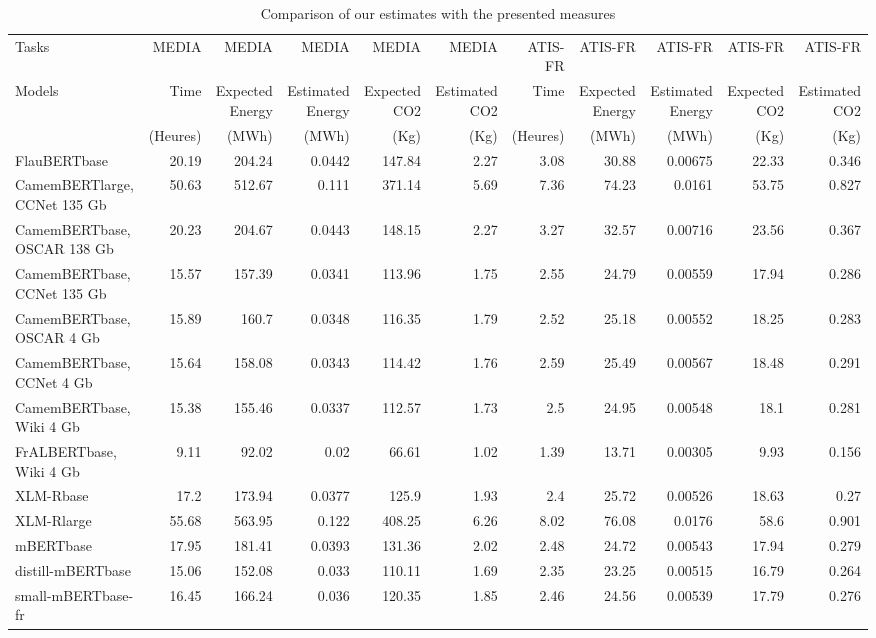 \documentclass[11pt]{article}
\begin{document}
\begin{table}[htbp]
\caption{Comparison of our estimates with the presented measures}
\centering
\begin{tabular}{lrrrrrrrrrr}
Tasks & MEDIA & MEDIA & MEDIA & MEDIA & MEDIA & ATIS-FR & ATIS-FR & ATIS-FR & ATIS-FR & ATIS-FR\\
Models & Time & Expected Energy & Estimated Energy & Expected CO2 & Estimated CO2 & Time & Expected Energy & Estimated Energy & Expected CO2 & Estimated CO2\\
 & (Heures) & (MWh) & (MWh) & (Kg) & (Kg) & (Heures) & (MWh) & (MWh) & (Kg) & (Kg)\\
\hline
FlauBERTbase & 20.19 & 204.24 & 0.0442 & 147.84 & 2.27 & 3.08 & 30.88 & 0.00675 & 22.33 & 0.346\\
CamemBERTlarge, CCNet 135 Gb & 50.63 & 512.67 & 0.111 & 371.14 & 5.69 & 7.36 & 74.23 & 0.0161 & 53.75 & 0.827\\
CamemBERTbase, OSCAR 138 Gb & 20.23 & 204.67 & 0.0443 & 148.15 & 2.27 & 3.27 & 32.57 & 0.00716 & 23.56 & 0.367\\
CamemBERTbase, CCNet 135 Gb & 15.57 & 157.39 & 0.0341 & 113.96 & 1.75 & 2.55 & 24.79 & 0.00559 & 17.94 & 0.286\\
CamemBERTbase, OSCAR 4 Gb & 15.89 & 160.7 & 0.0348 & 116.35 & 1.79 & 2.52 & 25.18 & 0.00552 & 18.25 & 0.283\\
CamemBERTbase, CCNet 4 Gb & 15.64 & 158.08 & 0.0343 & 114.42 & 1.76 & 2.59 & 25.49 & 0.00567 & 18.48 & 0.291\\
CamemBERTbase, Wiki 4 Gb & 15.38 & 155.46 & 0.0337 & 112.57 & 1.73 & 2.5 & 24.95 & 0.00548 & 18.1 & 0.281\\
FrALBERTbase, Wiki 4 Gb & 9.11 & 92.02 & 0.02 & 66.61 & 1.02 & 1.39 & 13.71 & 0.00305 & 9.93 & 0.156\\
XLM-Rbase & 17.2 & 173.94 & 0.0377 & 125.9 & 1.93 & 2.4 & 25.72 & 0.00526 & 18.63 & 0.27\\
XLM-Rlarge & 55.68 & 563.95 & 0.122 & 408.25 & 6.26 & 8.02 & 76.08 & 0.0176 & 58.6 & 0.901\\
mBERTbase & 17.95 & 181.41 & 0.0393 & 131.36 & 2.02 & 2.48 & 24.72 & 0.00543 & 17.94 & 0.279\\
distill-mBERTbase & 15.06 & 152.08 & 0.033 & 110.11 & 1.69 & 2.35 & 23.25 & 0.00515 & 16.79 & 0.264\\
small-mBERTbase-fr & 16.45 & 166.24 & 0.036 & 120.35 & 1.85 & 2.46 & 24.56 & 0.00539 & 17.79 & 0.276\\
\end{tabular}
\end{table}
\end{document}
